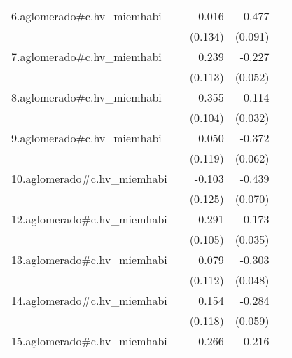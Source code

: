{\begin{longtable}{l*{4}{D{.}{.}{-1}}}
\addlinespace
6.aglomerado#c.hv\_miemhabi&                     &      -0.016         &      -0.477\sym{***}&                     \\
            &                     &     (0.134)         &     (0.091)         &                     \\
\addlinespace
7.aglomerado#c.hv\_miemhabi&                     &       0.239\sym{*}  &      -0.227\sym{***}&                     \\
            &                     &     (0.113)         &     (0.052)         &                     \\
\addlinespace
8.aglomerado#c.hv\_miemhabi&                     &       0.355\sym{***}&      -0.114\sym{***}&                     \\
            &                     &     (0.104)         &     (0.032)         &                     \\
\addlinespace
9.aglomerado#c.hv\_miemhabi&                     &       0.050         &      -0.372\sym{***}&                     \\
            &                     &     (0.119)         &     (0.062)         &                     \\
\addlinespace
10.aglomerado#c.hv\_miemhabi&                     &      -0.103         &      -0.439\sym{***}&                     \\
            &                     &     (0.125)         &     (0.070)         &                     \\
\addlinespace
12.aglomerado#c.hv\_miemhabi&                     &       0.291\sym{**} &      -0.173\sym{***}&                     \\
            &                     &     (0.105)         &     (0.035)         &                     \\
\addlinespace
13.aglomerado#c.hv\_miemhabi&                     &       0.079         &      -0.303\sym{***}&                     \\
            &                     &     (0.112)         &     (0.048)         &                     \\
\addlinespace
14.aglomerado#c.hv\_miemhabi&                     &       0.154         &      -0.284\sym{***}&                     \\
            &                     &     (0.118)         &     (0.059)         &                     \\
\addlinespace
15.aglomerado#c.hv\_miemhabi&                     &       0.266\sym{*}  &      -0.216\sym{**} &                     \\

\end{longtable}}
